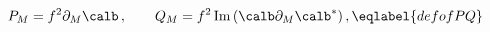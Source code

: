 \begin{equation}
P_M= f^2\partial_M \calb\,,\qquad Q_M= f^2\,{\rm Im}\,(
\calb\partial_M\calb^*)\,,
\eqlabel{defofPQ}
\end{equation}

